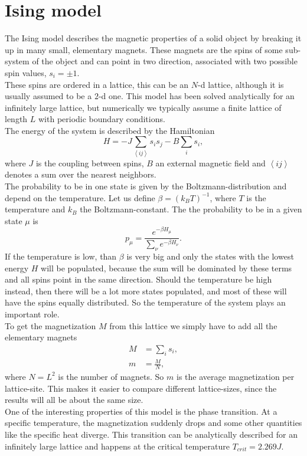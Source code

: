 \section{Ising model}

The Ising model describes the magnetic properties of a solid object by breaking it up in many small, elementary magnets. These magnets are the spins of some sub-system of the object and can point in two direction, associated with two possible spin values, $s_i = \pm 1$.\\
These spins are ordered in a lattice, this can be an $N$-d lattice, although it is usually assumed to be a $2$-d one. This model has been solved analytically for an infinitely large lattice, but numerically we typically assume a finite lattice of length $L$ with periodic boundary conditions.\\
The energy of the system is described by the Hamiltonian
\begin{equation}
H = - J \sum_{\left\langle i j \right\rangle} s_i s_j - B \sum_i s_i,
\end{equation}
where $J$ is the coupling between spins, $B$ an external magnetic field and $\left\langle i j \right\rangle$ denotes a sum over the nearest neighbors.\\
The probability to be in one state is given by the Boltzmann-distribution and depend on the temperature. Let us define $\beta = {(k_B T)}^{-1}$, where $T$ is the temperature and $k_B$ the Boltzmann-constant. The the probability to be in a given state $\mu$ is
\begin{equation}
 p_{\mu} = \frac{e^{- \beta H_{\mu}}}{\sum_{\nu} e^{- \beta H_{\nu}}}.
\end{equation}
If the temperature is low, than $\beta$ is very big and only the states with the lowest energy $H$ will be populated, because the sum will be dominated by these terms and all spins point in the same direction. Should the temperature be high instead, then there will be a lot more states populated, and most of these will have the spins equally distributed. So the temperature of the system plays an important role.\\
To get the magnetization $M$ from this lattice we simply have to add all the elementary magnets
\begin{align}
M & = \sum_i s_i, \\
m & = \frac{M}{N},
\end{align}
where $N = L^2$ is the number of magnets. So $m$ is the average magnetization per lattice-site. This makes it easier to compare different lattice-sizes, since the results will all be about the same size.\\
One of the interesting properties of this model is the phase transition. At a specific temperature, the magnetization suddenly drops and some other quantities like the specific heat diverge. This transition can be analytically described for an infinitely large lattice and happens at the critical temperature $T_{crit} = 2.269 J$.\\

